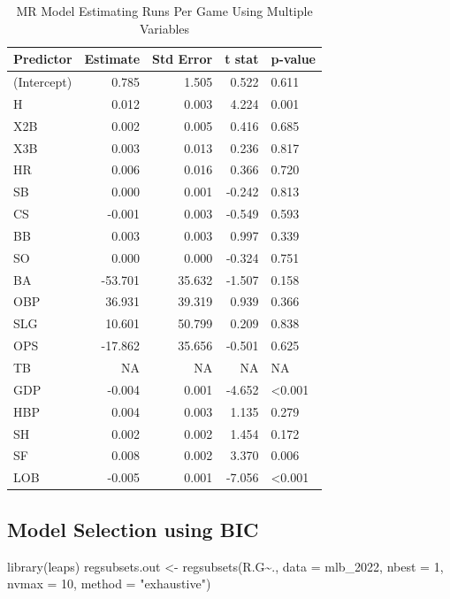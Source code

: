 \documentclass[
  11pt,
]{book}
\newenvironment{Shaded}{\begin{snugshade}}{\end{snugshade}}
\newcommand{\AttributeTok}[1]{\textcolor[rgb]{0.77,0.63,0.00}{#1}}
\newcommand{\DecValTok}[1]{\textcolor[rgb]{0.00,0.00,0.81}{#1}}
\newcommand{\FunctionTok}[1]{\textcolor[rgb]{0.00,0.00,0.00}{#1}}
\newcommand{\NormalTok}[1]{#1}
\newcommand{\OtherTok}[1]{\textcolor[rgb]{0.56,0.35,0.01}{#1}}
\newcommand{\SpecialCharTok}[1]{\textcolor[rgb]{0.00,0.00,0.00}{#1}}
\newcommand{\StringTok}[1]{\textcolor[rgb]{0.31,0.60,0.02}{#1}}
\theoremstyle{definition}
\theoremstyle{definition}
\theoremstyle{definition}
\theoremstyle{definition}
\theoremstyle{remark}
\begin{document}
\begin{table}[!h]

\caption{\label{tab:unnamed-chunk-219}MR Model Estimating Runs Per Game Using Multiple Variables}
\centering
\begin{tabular}[t]{lrrrl}
\toprule
Predictor & Estimate & Std Error & t stat & p-value\\
\midrule
(Intercept) & 0.785 & 1.505 & 0.522 & 0.611\\
H & 0.012 & 0.003 & 4.224 & 0.001\\
X2B & 0.002 & 0.005 & 0.416 & 0.685\\
X3B & 0.003 & 0.013 & 0.236 & 0.817\\
HR & 0.006 & 0.016 & 0.366 & 0.720\\
\addlinespace
SB & 0.000 & 0.001 & -0.242 & 0.813\\
CS & -0.001 & 0.003 & -0.549 & 0.593\\
BB & 0.003 & 0.003 & 0.997 & 0.339\\
SO & 0.000 & 0.000 & -0.324 & 0.751\\
BA & -53.701 & 35.632 & -1.507 & 0.158\\
\addlinespace
OBP & 36.931 & 39.319 & 0.939 & 0.366\\
SLG & 10.601 & 50.799 & 0.209 & 0.838\\
OPS & -17.862 & 35.656 & -0.501 & 0.625\\
TB & NA & NA & NA & NA\\
GDP & -0.004 & 0.001 & -4.652 & <0.001\\
\addlinespace
HBP & 0.004 & 0.003 & 1.135 & 0.279\\
SH & 0.002 & 0.002 & 1.454 & 0.172\\
SF & 0.008 & 0.002 & 3.370 & 0.006\\
LOB & -0.005 & 0.001 & -7.056 & <0.001\\
\bottomrule
\end{tabular}
\end{table}

\newpage

\hypertarget{model-selection-using-bic}{%
\subsection{Model Selection using BIC}\label{model-selection-using-bic}}

\begin{Shaded}
\begin{Highlighting}[]
\FunctionTok{library}\NormalTok{(leaps)}
\NormalTok{regsubsets.out }\OtherTok{\textless{}{-}}
    \FunctionTok{regsubsets}\NormalTok{(}\StringTok{\textasciigrave{}}\AttributeTok{R.G}\StringTok{\textasciigrave{}}\SpecialCharTok{\textasciitilde{}}\NormalTok{.,}
               \AttributeTok{data =}\NormalTok{ mlb\_2022,}
               \AttributeTok{nbest =} \DecValTok{1}\NormalTok{,}
               \AttributeTok{nvmax =} \DecValTok{10}\NormalTok{,}
               \AttributeTok{method =} \StringTok{"exhaustive"}\NormalTok{)}
\end{Highlighting}
\end{Shaded}
\end{document}
